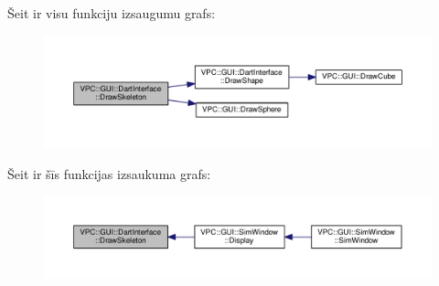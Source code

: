 Šeit ir visu funkciju izsaugumu grafs\+:
\nopagebreak
\begin{figure}[H]
\begin{center}
\leavevmode
\includegraphics[width=350pt]{namespace_v_p_c_1_1_g_u_i_1_1_dart_interface_a0f48bc6711d69c0979519f00998d1876_cgraph}
\end{center}
\end{figure}




Šeit ir šīs funkcijas izsaukuma grafs\+:
\nopagebreak
\begin{figure}[H]
\begin{center}
\leavevmode
\includegraphics[width=350pt]{namespace_v_p_c_1_1_g_u_i_1_1_dart_interface_a0f48bc6711d69c0979519f00998d1876_icgraph}
\end{center}
\end{figure}


